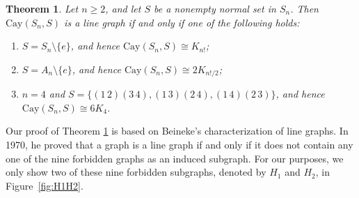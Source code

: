 \documentclass[12pt, a4paper]{article}
\newtheorem{thm}{Theorem}[section]
\theoremstyle{definition}
\begin{document}
\begin{thm}
\label{class-linegraph}
Let $n\ge 2$, and let $S$ be a nonempty normal set in $S_n$. Then $\mathrm{Cay}(S_n,S)$ is a line graph if and only if one of the following holds:
	\begin{enumerate}[\rm (a)]
		\item $S=S_n\setminus\{e\}$, and hence $\mathrm{Cay}(S_n,S)\cong K_{n!}$;
		\item $S=A_n\setminus\{e\}$, and hence $\mathrm{Cay}(S_n,S)\cong 2K_{n!/2}$;
		\item $n=4$ and $S=\{(1\,2)(3\,4), (1\,3)(2\,4), (1\,4)(2\,3)\}$, and hence $\mathrm{Cay}(S_n,S)\cong 6K_4$.
	\end{enumerate}
\end{thm}

Our proof of Theorem \ref{class-linegraph} is based on Beineke's characterization of line graphs. In 1970, he proved \cite{Beineke1970} that a graph is a line graph if and only if it does not contain any one of the nine forbidden graphs as an induced subgraph. For our purposes, we only show two of these nine forbidden subgraphs, denoted by $H_1$ and $H_2$, in Figure~\ref{fig:H1H2}. 
\end{document}
